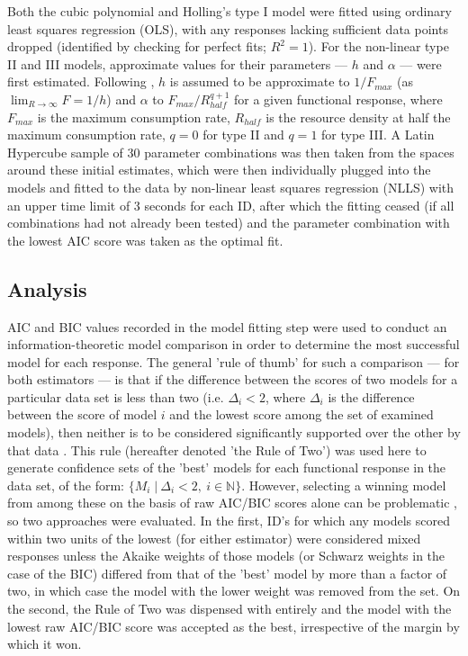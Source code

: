 \documentclass[11pt]{article}
\begin{document}
    Both the cubic polynomial and Holling's type I model were fitted using ordinary least squares regression (OLS), with any responses lacking sufficient data points dropped (identified by checking for perfect fits; $R^2=1$). For the non-linear type II and III models, approximate values for their parameters — $h$ and $\alpha$ — were first estimated. Following \citet{rosenbaum2018fitting, real1977kinetics}, $h$ is assumed to be approximate to $1/F_{max}$ (as $\lim_{R\to\infty}F=1/h$) and $\alpha$ to $F_{max}/R_{half}^{q+1}$ for a given functional response, where $F_{max}$ is the maximum consumption rate,  $R_{half}$ is the resource density at half the maximum consumption rate, $q=0$ for type II and $q=1$ for type III. A Latin Hypercube sample of 30 parameter combinations was then taken from the spaces around these initial estimates, which were then individually plugged into the models and fitted to the data by non-linear least squares regression (NLLS) with an upper time limit of 3 seconds for each ID, after which the fitting ceased (if all combinations had not already been tested) and the parameter combination with the lowest AIC score was taken as the optimal fit.
    
    \subsection{Analysis}
    
    AIC and BIC values recorded in the model fitting step were used to conduct an information-theoretic model comparison in order to determine the most successful model for each response. The general 'rule of thumb' for such a comparison — for both estimators — is that if the difference between the scores of two models for a particular data set is less than two  (i.e.  $\Delta_i<2$, where $\Delta_i$ is the difference between the score of model $i$ and the lowest score among the set of examined models), then neither is to be considered significantly supported over the other by that data \citep{anderson2004model}. This rule (hereafter denoted 'the Rule of Two') was used here to generate confidence sets of the 'best' models for each functional response in the data set, of the form: $\{M_{i}\;|\:\Delta _{i} < 2,\:i\in\mathbb{N}\}$. However, selecting a winning model from among these on the basis of raw AIC/BIC scores alone can be problematic \citep{wagenmakers2004aic}, so two approaches were evaluated. In the first, ID's for which any models scored within two units of the lowest (for either estimator) were considered mixed responses unless the Akaike weights of those models (or Schwarz weights in the case of the BIC) differed from that of the 'best' model by more than a factor of two, in which case the model with the lower weight was removed from the set. On the second, the Rule of Two was dispensed with entirely and the model with the lowest raw AIC/BIC score was accepted as the best, irrespective of the margin by which it won.
    
\end{document}
